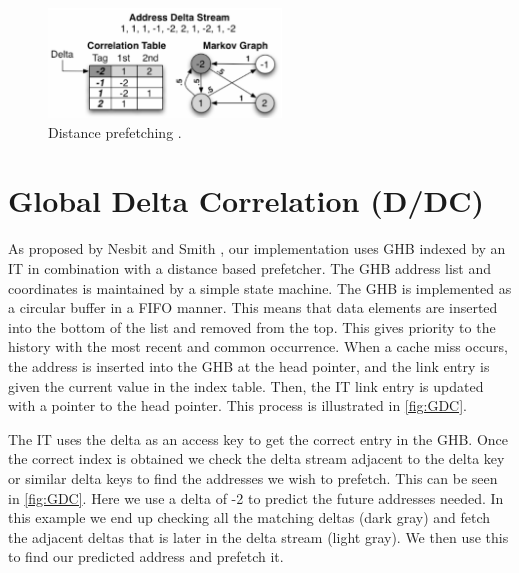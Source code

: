 \documentclass[conference]{IEEEtran}
\begin{document}
\begin{figure}[H]
    \vspace{5mm}
    \centering
     \includegraphics[width=62mm]{assets/distance-prefetching.png}
    \vspace{-2mm}
    \caption{Distance prefetching \cite{b1}.}
    \label{fig:Distance}
\end{figure}


\section{Global Delta Correlation (D/DC)}

As proposed by Nesbit and Smith \cite{b1}, our implementation uses GHB indexed by an IT in combination with a distance based prefetcher.
The GHB address list and coordinates is maintained by a simple state machine. The GHB is implemented as a circular buffer in a FIFO manner. This means that data elements are inserted into the bottom of the list and removed from the top. This gives priority to the history with the most recent and common occurrence. When a cache miss occurs, the address is inserted into the GHB at the head pointer, and the link entry is given the current value in the index table. Then, the IT link entry is updated with a pointer to the head pointer. This process is illustrated in \cref{fig:GDC}.

The IT uses the delta as an access key to get the correct entry in the GHB. Once the correct index is obtained we check the delta stream adjacent to the delta key or similar delta keys to find the addresses we wish to prefetch. This can be seen in \cref{fig:GDC}. Here we use a delta of -2 to predict the future addresses needed. In this example we end up checking all the matching deltas (dark gray) and fetch the adjacent deltas that is later in the delta stream (light gray). We then use this to find our predicted address and prefetch it.
\end{document}
